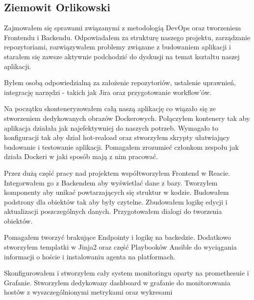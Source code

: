 \subsection{Ziemowit Orlikowski}
\par Zajmowałem się sprawami związanymi z metodologią DevOps oraz tworzeniem \gls{Frontend}u i \gls{Backend}u.
Odpowiadałem za strukturę naszego projektu, zarządzanie repozytoriami, rozwiązywałem problemy związane z budowaniem aplikacji i starałem się zawsze aktywnie podchodzić do dyskusji na temat kształtu naszej aplikacji.
\par Byłem osobą odpowiedzialną za założenie repozytoriów, ustalenie uprawnień, integrację narzędzi - takich jak Jira oraz przygotowanie workflow'ów. 
\par Na początku skonteneryzowałem całą naszą aplikację co wiązało się ze stworzeniem dedykowanych obrazów \gls{Docker}owych.
Połączyłem \gls{kontener}y tak aby aplikacja działała jak najefektywniej do naszych potrzeb.
Wymagało to konfiguracji tak aby dział hot-reaload oraz stworzyłem skrypty ułatwiający budowanie i testowanie aplikacji.
Pomagałem zrozumieć członkom zespołu jak działa \gls{Docker}i w jaki sposób mają z nim pracować.
\par Przez dużą część pracy nad projektem współtworzyłem \gls{Frontend} w Reacie.
Integorwałem go z \gls{Backend}em aby wyświetlać dane z bazy.
Tworzyłem komponenty aby unikać powtarzających się struktur w kodzie.
Budowałem podstrony dla obiektów tak aby były czytelne.
Zbudowałem logikę edycji i aktualizacji poszczególnych danych.
Przygotowałem dialogi do tworzenia obiektów.
\par Pomagałem tworzyć brakujące \gls{Endpoint}y i logikę na backedzie.
Dodatkowo stworzyłem templatki w Jinja2 oraz część \gls{Playbook}ów \gls{Ansible} do wyciągania informacji o hoście i instalowaniu agenta na \gls{platforma}ch. 
\par Skonfigurowałem i stworzyłem cały system monitoringu oparty na promethesuie i Grafanie.
Stworzyłem dedykowany dashboard w grafanie do monitorowania hostów z wyszczególnionymi metrykami oraz wykresami 
